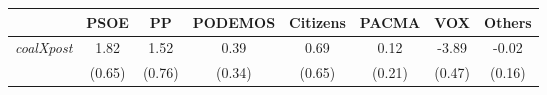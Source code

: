 \begin{table}[ht]
\centering
\begin{tabular}{lccccccc}
\hline
\hline
& PSOE & PP & PODEMOS & Citizens & PACMA & VOX & Others \\
\hline
\textit{coalXpost} & 1.82 & 1.52 & 0.39 & 0.69 & 0.12 & -3.89 & -0.02 \\
\textit{} & (0.65) & (0.76) & (0.34) & (0.65) & (0.21) & (0.47) & (0.16) \\
\hline
\hline
\end{tabular}
\end{table}